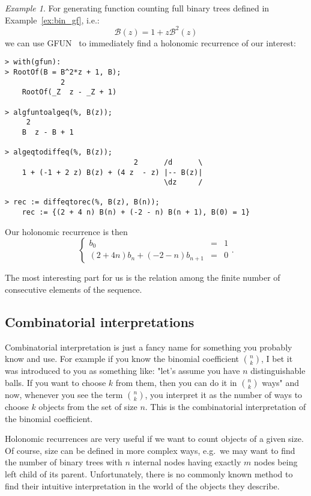\documentclass[final]{article}
\theoremstyle{definition}
\theoremstyle{remark}
\newtheorem{example}{Example}[subsection]
\newcommand{\gf}[1]{\ensuremath{\mathcal{#1}}}
\begin{document}
\begin{example}
    \label{ex:gfun-rec}
    For generating function counting full binary trees defined in Example~\ref{ex:bin_gf}, i.e.:
    \[\gf{B}(z) = 1 + z\gf{B}^2(z)\]
    we can use GFUN~\cite{gfun} to immediately find a holonomic recurrence of our interest:

    \begin{lstlisting}
> with(gfun):
> RootOf(B = B^2*z + 1, B);
             2
    RootOf(_Z  z - _Z + 1)

> algfuntoalgeq(%, B(z));
     2
    B  z - B + 1

> algeqtodiffeq(%, B(z));
                              2      /d      \
    1 + (-1 + 2 z) B(z) + (4 z  - z) |-- B(z)|
                                     \dz     /

> rec := diffeqtorec(%, B(z), B(n));
    rec := {(2 + 4 n) B(n) + (-2 - n) B(n + 1), B(0) = 1}
    \end{lstlisting}

    Our holonomic recurrence is then
    \[\left\{\begin{array}{rcl}
                b_0 &=& 1\\
                (2 + 4 n) b_n + (-2 - n) b_{n + 1} &=& 0
    \end{array}\right. .\]

    The most interesting part for us is the relation among the finite number of consecutive elements of the sequence.
\end{example}

\subsection{Combinatorial interpretations}%
\label{sub:combinatorial_interpretations}

Combinatorial interpretation is just a fancy name for something you probably know and use. For example if you know the binomial coefficient \(\binom{n}{k}\), I bet it was introduced to you as something like: "let's assume you have \(n\) distinguishable balls. If you want to choose \(k\) from them, then you can do it in \(\binom{n}{k}\) ways" and now, whenever you see the term \(\binom{n}{k}\), you interpret it as the number of ways to choose \(k\) objects from the set of size \(n\). This is the combinatorial interpretation of the binomial coefficient.

Holonomic recurrences are very useful if we want to count objects of a given size. Of course, size can be defined in more complex ways, e.g.\ we may want to find the number of binary trees with \(n\) internal nodes having exactly \(m\) nodes being left child of its parent. Unfortunately, there is no commonly known method to find their intuitive interpretation in the world of the objects they describe.
\end{document}
